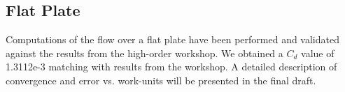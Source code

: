 \graphicspath{{figures_flatplate/}}%

\subsection{Flat Plate}
Computations of the flow over a flat plate have been performed and validated against the results from the high-order workshop. We obtained a $C_{d}$ value of 1.3112e-3 matching with results from the workshop. A detailed description of convergence and error vs. work-units will be presented in the final draft.  
